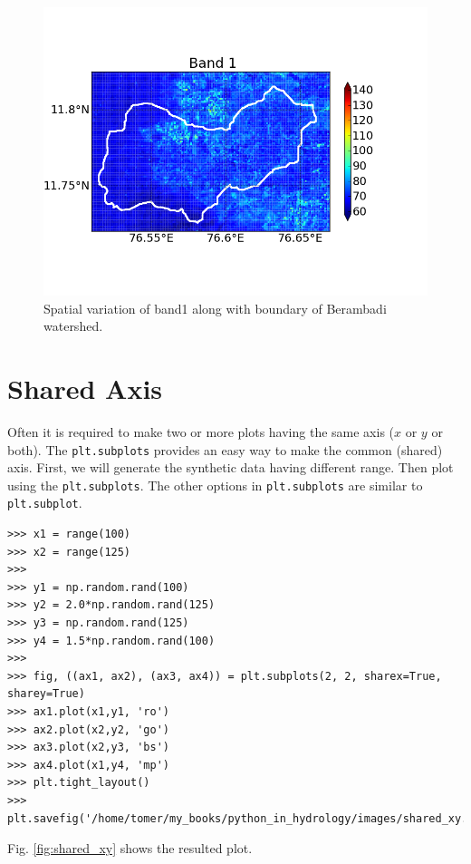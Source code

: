 \documentclass[10pt]{book}
\begin{document}
\beforefig
\begin{figure}[h!]
  \centering
    \includegraphics[scale=0.5]{images/basemap.png}
  \caption{Spatial variation of band1 along with boundary of Berambadi watershed.}
   \label{fig:basemap}
\end{figure}
\afterfig


\section{Shared Axis}
Often it is required to make two or more plots having the same axis ($x$ or $y$ or both). The \verb"plt.subplots" provides an easy way to make the common (shared) axis. First, we will generate the synthetic data having different range. Then plot using the \verb"plt.subplots". The other options in \verb"plt.subplots" are similar to \verb"plt.subplot". 
\beforeverb \begin{verbatim}
>>> x1 = range(100)
>>> x2 = range(125)
>>> 
>>> y1 = np.random.rand(100)
>>> y2 = 2.0*np.random.rand(125)
>>> y3 = np.random.rand(125)
>>> y4 = 1.5*np.random.rand(100)
>>> 
>>> fig, ((ax1, ax2), (ax3, ax4)) = plt.subplots(2, 2, sharex=True, sharey=True)
>>> ax1.plot(x1,y1, 'ro')
>>> ax2.plot(x2,y2, 'go')
>>> ax3.plot(x2,y3, 'bs')
>>> ax4.plot(x1,y4, 'mp')
>>> plt.tight_layout()
>>> plt.savefig('/home/tomer/my_books/python_in_hydrology/images/shared_xy.png')
\end{verbatim} \afterverb
Fig. \ref{fig:shared_xy} shows the resulted plot.
\end{document}
